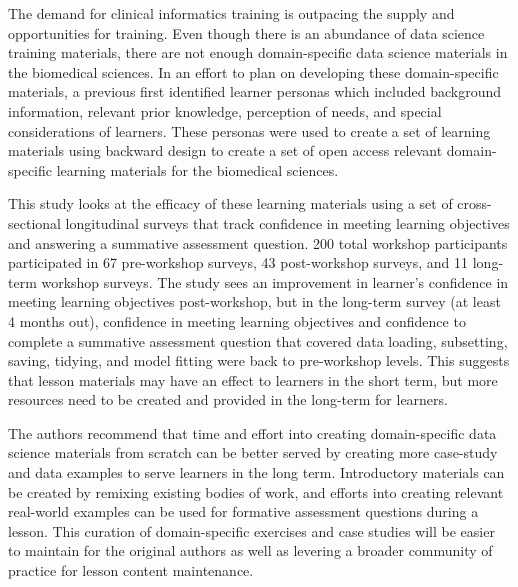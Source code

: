 \documentclass[030-workshop.tex]{subfiles}
\begin{document}
The demand for clinical informatics training is outpacing the supply and opportunities for training.
Even though there is an abundance of data science training materials,
there are not enough domain-specific data science materials in the biomedical sciences.
In an effort to plan on developing these domain-specific materials,
a previous first identified learner personas which included background information,
relevant prior knowledge, perception of needs, and special considerations of learners.
These personas were used to create a set of learning materials using backward design
to create a set of open access relevant domain-specific learning materials for the biomedical sciences.

This study looks at the efficacy of these learning materials using a set of
cross-sectional longitudinal surveys that track confidence in meeting learning objectives
and answering a summative assessment question.
200 total workshop participants participated in 67 pre-workshop surveys,
43 post-workshop surveys, and 11 long-term workshop surveys.
The study sees an improvement in learner's confidence in meeting learning objectives
post-workshop, but in the long-term survey (at least 4 months out),
confidence in meeting learning objectives and confidence to complete a summative assessment question
that covered data loading, subsetting, saving, tidying, and model fitting were back to pre-workshop levels.
This suggests that lesson materials may have an effect to learners in the short term,
but more resources need to be created and provided in the long-term
for learners.

The authors recommend that time and effort into creating domain-specific data science materials from scratch
can be better served by creating more case-study and data examples to serve learners in the long term.
Introductory materials can be created by remixing existing bodies of work,
and efforts into creating relevant real-world examples can be used for formative assessment questions
during a lesson.
This curation of domain-specific exercises and case studies will be easier to maintain for
the original authors as well as levering a broader community of practice for lesson
content maintenance.
\end{document}
